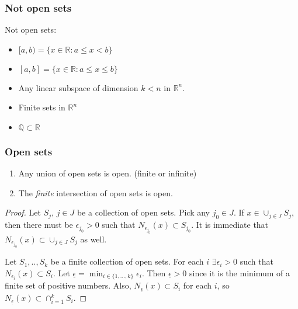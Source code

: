 \documentclass[compress]{beamer}
\def\R{\mathbb{R}}
\begin{document}
\begin{frame}
  \frametitle{Not open sets}
  \begin{example}
    Not open sets:
    \begin{itemize}
    \item $[a, b) = \{x \in \R: a\leq x < b\}$
    \item $[a, b] = \{x \in \R: a\leq x \leq b\}$
    \item Any linear subspace of dimension $k<n$ in $\R^n$. 
    \item Finite sets in $\R^n$
    \item $\mathbb{Q} \subset \R$
    \end{itemize}
  \end{example}
\end{frame}

\begin{frame}
  \frametitle{Open sets}
  \begin{theorem}
    \begin{enumerate} \label{thm:uio}
    \item Any union of open sets is open. (finite or infinite)
    \item The \emph{finite} intersection of open sets is open.
    \end{enumerate}
  \end{theorem}
  \begin{proof}
    Let $S_j$, $j \in J$ be a collection of open sets. Pick any $j_0 \in
    J$. If $x \in \cup_{j \in J} S_j$, then there must be $\epsilon_{j_0} >
    0$ such that $N_{\epsilon_{j_0}} (x) \subset S_{j_0}$. It is
    immediate that $N_{\epsilon_{j_0}} (x) \subset \cup_{j \in J} S_j$
    as well. 

    Let $S_1, .., S_k$ be a finite collection of open sets. For each $i$
    $\exists \epsilon_i > 0$ such that $N_{\epsilon_i}(x) \subset
    S_i$. Let $\underline{\epsilon} = \min_{i \in \{1,..., k\}}
    \epsilon_i$. Then $\underline{\epsilon}>0$ since it is the minimum
    of a finite set of positive numbers. Also,
    $N_{\underline{\epsilon}}(x) \subset S_i$ for each $i$, so
    $N_{\underline{\epsilon}}(x) \subset \cap_{i=1}^k S_i$. 
  \end{proof}
\end{frame}
\end{document}
